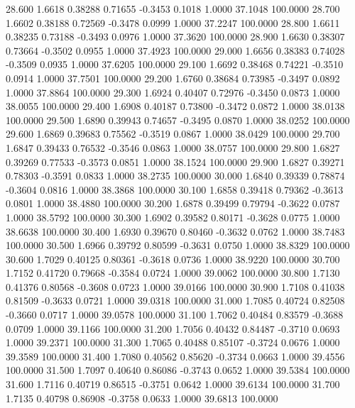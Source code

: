   28.600   1.6618   0.38288   0.71655  -0.3453   0.1018   1.0000  37.1048 100.0000
  28.700   1.6602   0.38188   0.72569  -0.3478   0.0999   1.0000  37.2247 100.0000
  28.800   1.6611   0.38235   0.73188  -0.3493   0.0976   1.0000  37.3620 100.0000
  28.900   1.6630   0.38307   0.73664  -0.3502   0.0955   1.0000  37.4923 100.0000
  29.000   1.6656   0.38383   0.74028  -0.3509   0.0935   1.0000  37.6205 100.0000
  29.100   1.6692   0.38468   0.74221  -0.3510   0.0914   1.0000  37.7501 100.0000
  29.200   1.6760   0.38684   0.73985  -0.3497   0.0892   1.0000  37.8864 100.0000
  29.300   1.6924   0.40407   0.72976  -0.3450   0.0873   1.0000  38.0055 100.0000
  29.400   1.6908   0.40187   0.73800  -0.3472   0.0872   1.0000  38.0138 100.0000
  29.500   1.6890   0.39943   0.74657  -0.3495   0.0870   1.0000  38.0252 100.0000
  29.600   1.6869   0.39683   0.75562  -0.3519   0.0867   1.0000  38.0429 100.0000
  29.700   1.6847   0.39433   0.76532  -0.3546   0.0863   1.0000  38.0757 100.0000
  29.800   1.6827   0.39269   0.77533  -0.3573   0.0851   1.0000  38.1524 100.0000
  29.900   1.6827   0.39271   0.78303  -0.3591   0.0833   1.0000  38.2735 100.0000
  30.000   1.6840   0.39339   0.78874  -0.3604   0.0816   1.0000  38.3868 100.0000
  30.100   1.6858   0.39418   0.79362  -0.3613   0.0801   1.0000  38.4880 100.0000
  30.200   1.6878   0.39499   0.79794  -0.3622   0.0787   1.0000  38.5792 100.0000
  30.300   1.6902   0.39582   0.80171  -0.3628   0.0775   1.0000  38.6638 100.0000
  30.400   1.6930   0.39670   0.80460  -0.3632   0.0762   1.0000  38.7483 100.0000
  30.500   1.6966   0.39792   0.80599  -0.3631   0.0750   1.0000  38.8329 100.0000
  30.600   1.7029   0.40125   0.80361  -0.3618   0.0736   1.0000  38.9220 100.0000
  30.700   1.7152   0.41720   0.79668  -0.3584   0.0724   1.0000  39.0062 100.0000
  30.800   1.7130   0.41376   0.80568  -0.3608   0.0723   1.0000  39.0166 100.0000
  30.900   1.7108   0.41038   0.81509  -0.3633   0.0721   1.0000  39.0318 100.0000
  31.000   1.7085   0.40724   0.82508  -0.3660   0.0717   1.0000  39.0578 100.0000
  31.100   1.7062   0.40484   0.83579  -0.3688   0.0709   1.0000  39.1166 100.0000
  31.200   1.7056   0.40432   0.84487  -0.3710   0.0693   1.0000  39.2371 100.0000
  31.300   1.7065   0.40488   0.85107  -0.3724   0.0676   1.0000  39.3589 100.0000
  31.400   1.7080   0.40562   0.85620  -0.3734   0.0663   1.0000  39.4556 100.0000
  31.500   1.7097   0.40640   0.86086  -0.3743   0.0652   1.0000  39.5384 100.0000
  31.600   1.7116   0.40719   0.86515  -0.3751   0.0642   1.0000  39.6134 100.0000
  31.700   1.7135   0.40798   0.86908  -0.3758   0.0633   1.0000  39.6813 100.0000
